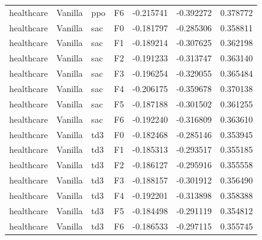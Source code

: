 \begin{tabular}{llllrrr}
healthcare & Vanilla &       ppo &  F6 & -0.215741 & -0.392272 &  0.378772 \\
healthcare & Vanilla &       sac &  F0 & -0.181797 & -0.285306 &  0.358811 \\
healthcare & Vanilla &       sac &  F1 & -0.189214 & -0.307625 &  0.362198 \\
healthcare & Vanilla &       sac &  F2 & -0.191233 & -0.313747 &  0.363140 \\
healthcare & Vanilla &       sac &  F3 & -0.196254 & -0.329055 &  0.365484 \\
healthcare & Vanilla &       sac &  F4 & -0.206175 & -0.359678 &  0.370138 \\
healthcare & Vanilla &       sac &  F5 & -0.187188 & -0.301502 &  0.361255 \\
healthcare & Vanilla &       sac &  F6 & -0.192240 & -0.316809 &  0.363610 \\
healthcare & Vanilla &       td3 &  F0 & -0.182468 & -0.285146 &  0.353945 \\
healthcare & Vanilla &       td3 &  F1 & -0.185313 & -0.293517 &  0.355185 \\
healthcare & Vanilla &       td3 &  F2 & -0.186127 & -0.295916 &  0.355558 \\
healthcare & Vanilla &       td3 &  F3 & -0.188157 & -0.301912 &  0.356490 \\
healthcare & Vanilla &       td3 &  F4 & -0.192201 & -0.313898 &  0.358388 \\
healthcare & Vanilla &       td3 &  F5 & -0.184498 & -0.291119 &  0.354812 \\
healthcare & Vanilla &       td3 &  F6 & -0.186533 & -0.297115 &  0.355745 \\
\bottomrule
\end{tabular}
